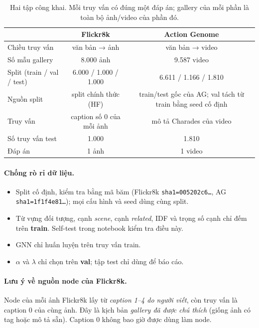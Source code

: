 \documentclass[11pt,a4paper]{article}
\begin{document}
\begin{table}[H]
\centering\small
\begin{tabular}{lcc}
\toprule
 & \textbf{Flickr8k} & \textbf{Action Genome} \\
\midrule
Chiều truy vấn & văn bản → ảnh & văn bản → video \\
Số mẫu gallery & 8.000 ảnh & 9.587 video \\
Split (train / val / test) & 6.000 / 1.000 / 1.000 & 6.611 / 1.166 / 1.810 \\
Nguồn split & split chính thức (HF) & train/test gốc của AG; val tách từ train bằng seed cố định \\
Truy vấn & caption số 0 của mỗi ảnh & mô tả Charades của video \\
Số truy vấn test & 1.000 & 1.810 \\
Đáp án & 1 ảnh & 1 video \\
\bottomrule
\end{tabular}
\caption{Hai tập công khai. Mỗi truy vấn có đúng một đáp án; gallery của mỗi phần là toàn bộ ảnh/video của phần đó.}
\label{tab:data}
\end{table}

\paragraph{Chống rò rỉ dữ liệu.}
\begin{itemize}
  \item Split cố định, kiểm tra bằng mã băm (Flickr8k \texttt{sha1=005202c6\ldots}, AG \texttt{sha1=1f1f4e81\ldots}); mọi cấu hình và seed dùng cùng split.
  \item Từ vựng đối tượng, cạnh \emph{scene}, cạnh \emph{related}, IDF và trọng số cạnh chỉ đếm trên \textbf{train}. Self-test trong notebook kiểm tra điều này.
  \item GNN chỉ huấn luyện trên truy vấn train.
  \item \(\alpha\) và \(\lambda\) chỉ chọn trên \textbf{val}; tập test chỉ dùng để báo cáo.
\end{itemize}

\paragraph{Lưu ý về nguồn node của Flickr8k.} Node của mỗi ảnh Flickr8k lấy từ \emph{caption 1–4 do người viết}, còn truy vấn là caption 0 của cùng ảnh. Đây là kịch bản \emph{gallery đã được chú thích} (giống ảnh có tag hoặc mô tả sẵn). Caption 0 không bao giờ được dùng làm node.
\end{document}
